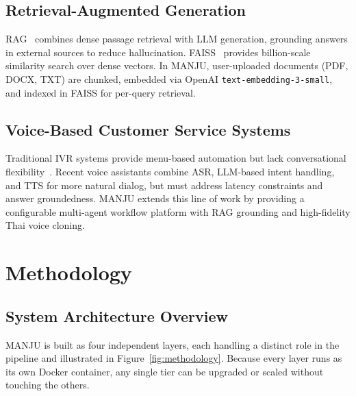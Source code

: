 \documentclass[10pt, a4paper, twocolumn]{article}
\begin{document}
\subsection{Retrieval-Augmented Generation}
RAG~\cite{lewis2020rag} combines dense passage retrieval with LLM generation, grounding answers in external sources to reduce hallucination.
FAISS~\cite{johnson2019faiss} provides billion-scale similarity search over dense vectors.
In MANJU, user-uploaded documents (PDF, DOCX, TXT) are chunked, embedded via OpenAI \texttt{text-embedding-3-small}, and indexed in FAISS for per-query retrieval.

\subsection{Voice-Based Customer Service Systems}
Traditional IVR systems provide menu-based automation but lack conversational flexibility~\cite{gans2003callcenters}.
Recent voice assistants combine ASR, LLM-based intent handling, and TTS for more natural dialog, but must address latency constraints and answer groundedness.
MANJU extends this line of work by providing a configurable multi-agent workflow platform with RAG grounding and high-fidelity Thai voice cloning.

\section{Methodology}
\label{sec:methodology}

\subsection{System Architecture Overview}

MANJU is built as four independent layers, each handling a distinct role
in the pipeline and illustrated in Figure~\ref{fig:methodology}.
Because every layer runs as its own Docker container, any single tier can
be upgraded or scaled without touching the others.
\end{document}
